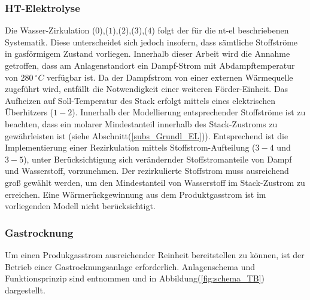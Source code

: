 \documentclass[onecolumn,10pt,titlepage]{article}
\begin{document}
\subsubsection{HT-Elektrolyse}
\label{subsubs_peri_schem_HT}
Die Wasser-Zirkulation ($0$),($1$),($2$),($3$),($4$) folgt der für die \gls{nt}-\gls{el} beschriebenen Systematik. Diese unterscheidet sich jedoch insofern, dass sämtliche Stoffströme in gasförmigem Zustand vorliegen. Innerhalb dieser Arbeit wird die Annahme getroffen, dass am Anlagenstandort ein Dampf-Strom mit Abdampftemperatur von $280~^\circ C$ verfügbar ist. Da der Dampfstrom von einer externen Wärmequelle zugeführt wird, entfällt die Notwendigkeit einer weiteren Förder-Einheit. Das Aufheizen auf Soll-Temperatur des Stack erfolgt mittels eines elektrischen Überhitzers ($1-2$). Innerhalb der Modellierung entsprechender Stoffströme ist zu beachten, dass ein molarer Mindestanteil innerhalb des Stack-Zustroms zu gewährleisten ist (siehe Abschnitt(\ref{subs_Grundl_EL})). Entsprechend ist die Implementierung einer Rezirkulation mittels Stoffstrom-Aufteilung ($3-4$ und $3-5$), unter Berücksichtigung sich verändernder Stoffstromanteile von Dampf und Wasserstoff, vorzunehmen. Der rezirkulierte Stoffstrom muss ausreichend groß gewählt werden, um den Mindestanteil von Wasserstoff im Stack-Zustrom zu erreichen. Eine Wärmerückgewinnung aus dem Produktgasstrom ist im vorliegenden Modell nicht berücksichtigt.

\subsubsection{Gastrocknung}
\label{subsubs_peri_schem_Gastrockn}
Um einen Produkgasstrom ausreichender Reinheit bereitstellen zu können, ist der Betrieb einer Gastrocknungsanlage erforderlich. Anlagenschema und Funktionsprinzip sind \cite{Tjarks2017} entnommen und in Abbildung(\ref {fig:schema_TB}) dargestellt.
\end{document}
